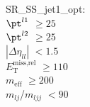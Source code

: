 SR\_SS\_jet1\_opt: \\
$\pt^{l1}$ $\geq 25$ \\
$\pt^{l2}$ $\geq 25$ \\
$|\Delta\eta_{ll}|$ $<1.5$ \\
$E_{\text{T}}^{\text{miss,rel}}$ $\geq 110$ \\
$m_{\text{eff}}$ $\geq 200$ \\
$m_{lj}$/$m_{ljj}$ $<90$ \\
